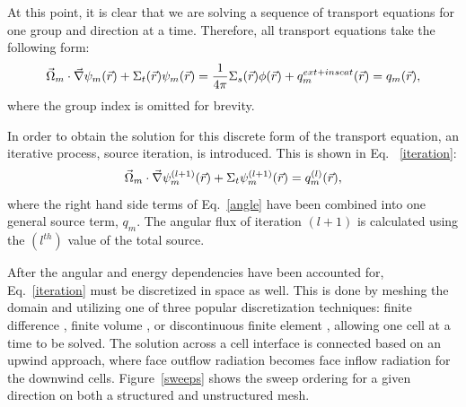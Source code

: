 At this point, it is clear that we are solving a sequence of transport equations for one group and direction at a time. Therefore, all transport equations take the following form:
\begin{equation}
\vec{\Omega}_m \cdot \vec \nabla \psi_{m}(\vec{r}) +\Sigma_{t}(\vec{r}) \psi_{m}(\vec{r})  = \frac{1}{4\pi}\Sigma_{s}(\vec{r})\phi(\vec{r}) + q^{ext+inscat}_m(\vec{r}) = q_m(\vec{r}),
\end{equation}
where the group index is omitted for brevity.

In order to obtain the solution for this discrete form of the transport equation, an iterative process, source iteration, is introduced. This is shown in Eq. ~\eqref{iteration}:
\begin{equation}
\vec{\Omega}_m \cdot \vec\nabla \psi_m^{(l+1)}(\vec{r}) + \Sigma_t \psi_m^{(l+1)}(\vec{r}) = q_m^{(l)}(\vec{r}),
\label{iteration}
\end{equation}
where the right hand side terms of Eq.~\eqref{angle} have been combined into one general source term, $q_m$. The angular flux of iteration $(l+1)$ is calculated using the $(l^{th})$ value of the total source.

After the angular and energy dependencies have been accounted for, Eq.~\eqref{iteration} must be discretized in space as well. This is done by meshing the domain and utilizing one of three popular discretization techniques: finite difference \cite{fd}, finite volume \cite{fd}, or discontinuous finite element \cite{Reed}, allowing one cell at a time to be solved. The solution across a cell interface is connected based on an upwind approach, where face outflow radiation becomes face inflow radiation for the downwind cells. Figure~\ref{sweeps} shows the sweep ordering for a given direction on both a structured and unstructured mesh.

